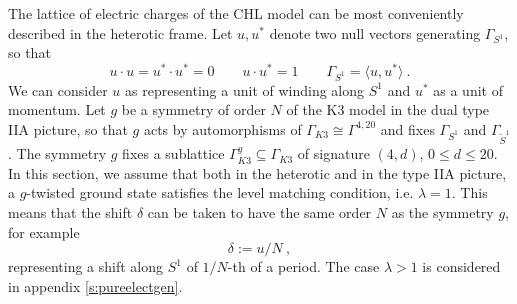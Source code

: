 \documentclass[a4paper,11pt]{article}
\numberwithin{equation}{section}
\def\be{\begin{equation}}
\def\ee{\end{equation}}
\begin{document}
The lattice of electric charges of the CHL model can be most conveniently described in the heterotic frame. Let $u,u^*$ denote two null vectors generating $\Gamma_{S^1}$, so that
\be u\cdot u=u^*\cdot u^*=0\qquad u\cdot u^*=1\qquad \Gamma_{S^1}=\langle u, u^*\rangle\ .
\ee  We can consider $u$ as representing a unit of winding along $S^1$ and $u^*$ as a unit of momentum. Let $g$ be a symmetry of order $N$ of the K3 model in the dual type IIA picture, so that $g$ acts by automorphisms of $\Gamma_{K3}\cong \Gamma^{4,20}$ and fixes $\Gamma_{S^1}$ and $\Gamma_{\tilde S^1}$. The symmetry $g$ fixes a sublattice $\Gamma_{K3}^g\subseteq \Gamma_{K3}$ of signature $(4,d)$, $0\le d\le 20$. In this section, we assume that both in the heterotic and in the type IIA picture, a $g$-twisted ground state satisfies the level matching condition, i.e. $\lambda=1$. This means that the shift $\delta$ can be taken to have the same order $N$ as the symmetry $g$, for example \be \delta:=u/N \ ,
\ee representing a shift along $S^1$ of $1/ N$-th of a period. The case $\lambda>1$ is considered in appendix \ref{s:pureelectgen}. 





\end{document}
